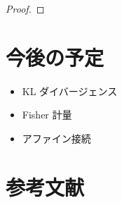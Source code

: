 \documentclass[report]{jlreq}
\begin{document}
\begin{corollary}[対数分配関数の凸性]
\end{corollary}

\begin{proof}
    \TODO{}
\end{proof}



%
\section{今後の予定}

\begin{itemize}
    \item KL ダイバージェンス
    \item Fisher 計量
    \item アファイン接続
\end{itemize}

%
\section{参考文献}

\nocite{amari_information_2016}
\nocite{bn1970_pdf}

{
    \renewcommand{\bibsection}{}
    
    
}
\end{document}
